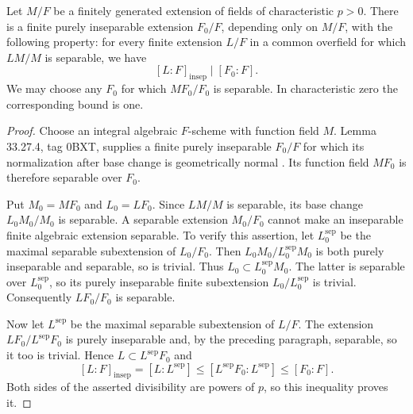 \begin{lemma}
\label{D:residual-inseparability-bound}
Let $M/F$ be a finitely generated extension of fields of
characteristic $p>0$.  There is a finite purely inseparable
extension $F_0/F$, depending only on $M/F$, with the following
property: for every finite extension $L/F$ in a common
overfield for which $LM/M$ is separable, we have
\[
                 [L:F]_{\mathrm{insep}}\mid [F_0:F].
\]
We may choose any $F_0$ for which $MF_0/F_0$ is separable.
In characteristic zero the corresponding bound is one.
\end{lemma}
\begin{proof}
Choose an integral algebraic $F$-scheme with function field
$M$.  Lemma 33.27.4, tag 0BXT, supplies a finite purely
inseparable $F_0/F$ for which its normalization after base
change is geometrically normal
\cite{C_StacksLogFibration}.  Its function field $MF_0$
is therefore separable over $F_0$.

Put $M_0=MF_0$ and $L_0=LF_0$.  Since $LM/M$ is separable,
its base change $L_0M_0/M_0$ is separable.  A separable
extension $M_0/F_0$ cannot make an inseparable finite
algebraic extension separable.  To verify this assertion,
let $L_0^{\mathrm{sep}}$ be the maximal separable
subextension of $L_0/F_0$.  Then
$L_0M_0/L_0^{\mathrm{sep}}M_0$ is both purely inseparable
and separable, so is trivial.  Thus
$L_0\subset L_0^{\mathrm{sep}}M_0$.  The latter is separable
over $L_0^{\mathrm{sep}}$, so its purely inseparable finite
subextension $L_0/L_0^{\mathrm{sep}}$ is trivial.
Consequently $LF_0/F_0$ is separable.

Now let $L^{\mathrm{sep}}$ be the maximal separable
subextension of $L/F$.  The extension
$LF_0/L^{\mathrm{sep}}F_0$ is purely inseparable and,
by the preceding paragraph, separable, so it too is
trivial.  Hence $L\subset L^{\mathrm{sep}}F_0$ and
\[
 [L:F]_{\mathrm{insep}}
  =[L:L^{\mathrm{sep}}]
  \leq [L^{\mathrm{sep}}F_0:L^{\mathrm{sep}}]
  \leq [F_0:F].
\]
Both sides of the asserted divisibility are powers of
$p$, so this inequality proves it.
\end{proof}

